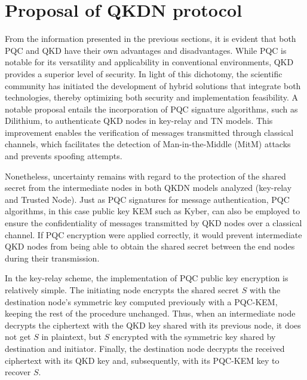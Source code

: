 \documentclass[conference]{IEEEtran}
\begin{document}
\section{Proposal of QKDN protocol} \label{sec:qsn}




From the information presented in the previous sections, it is evident that both PQC and QKD have their own advantages and disadvantages. While PQC is notable for its versatility and applicability in conventional environments, QKD provides a superior level of security. In light of this dichotomy, the scientific community has initiated the development of hybrid solutions that integrate both technologies, thereby optimizing both security and implementation feasibility. A notable proposal entails the incorporation of PQC signature algorithms, such as Dilithium, to authenticate QKD nodes in key-relay and TN models\cite{james2023key}. This improvement enables the verification of messages transmitted through classical channels, which facilitates the detection of Man-in-the-Middle (MitM) attacks and prevents spoofing attempts.

Nonetheless, uncertainty remains with regard to the protection of the shared secret from the intermediate nodes in both QKDN models analyzed (key-relay and Trusted Node). Just as PQC signatures for message authentication, PQC algorithms, in this case public key KEM such as Kyber, can also be employed to ensure the confidentiality of messages transmitted by QKD nodes over a classical channel. If PQC encryption were applied correctly, it would prevent intermediate QKD nodes from being able to obtain the shared secret between the end nodes during their transmission.

In the key-relay scheme, the implementation of PQC public key encryption is relatively simple. The initiating node encrypts the shared secret $S$ with the destination node's symmetric key computed previously with a PQC-KEM, keeping the rest of the procedure unchanged. Thus, when an intermediate node decrypts the ciphertext with the QKD key shared with its previous node, it does not get $S$ in plaintext, but $S$ encrypted with the symmetric key shared by destination and initiator. Finally, the destination node decrypts the received ciphertext with its QKD key and, subsequently, with its PQC-KEM key to recover $S$. 
\end{document}
